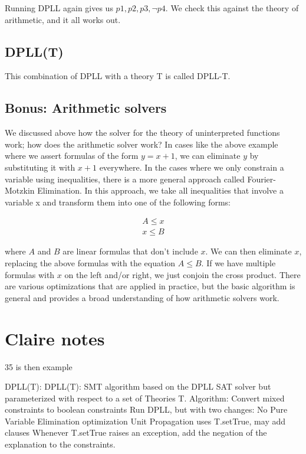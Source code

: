 \documentclass[11pt]{article}
\begin{document}
Running DPLL again gives us $p1, p2, p3, \lnot p4$. We check this against the
theory of arithmetic, and it all works out.

\subsection{DPLL(T)} 

 This combination of DPLL with a
theory T is called DPLL-T.

\subsection{Bonus: Arithmetic solvers}

We discussed above how the solver for the theory of uninterpreted functions
work; how does the arithmetic solver work? In cases like the above example where
we assert formulas of the form $y = x + 1$, we can eliminate $y$ by substituting
it with $x+1$ everywhere. In the cases where we only constrain a variable using
inequalities, there is a more general approach called Fourier-Motzkin
Elimination. In this approach, we take all inequalities that involve a variable
x and transform them into one of the following forms:

\[
\begin{array}{c}
A \leq x \\
x \leq B
\end{array}
\]

where $A$ and $B$ are linear formulas that don't include $x$. We can then
eliminate $x$, replacing the above formulas with the equation $A \leq B$. If we
have multiple formulas with $x$ on the left and/or right, we just conjoin the
cross product. There are various optimizations that are applied in practice, but
the basic algorithm is general and provides a broad understanding of how
arithmetic solvers work.


\iffalse
\section{Claire notes}


35 is then example 

DPLL(T): DPLL(T): SMT algorithm based on the DPLL SAT solver but parameterized with respect to a set of Theories T. 
Algorithm:
Convert mixed constraints to boolean constraints
Run DPLL, but with two changes:
No Pure Variable Elimination optimization
Unit Propagation uses T.setTrue, may add clauses
Whenever T.setTrue raises an exception, add the negation of the explanation to the constraints.
\end{document}
